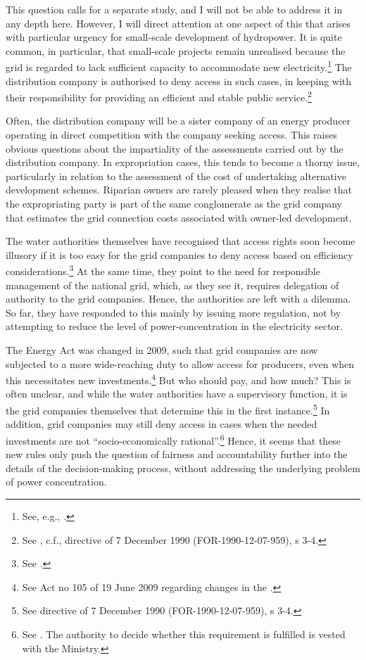This question calls for a separate study, and I will not be able to address it in any depth here. However, I will direct attention at one aspect of this that arises with particular urgency for small-scale development of hydropower. It is quite common, in particular, that small-scale projects remain unrealised because the grid is regarded to lack sufficient capacity to accommodate new electricity.\footnote{See, e.g., \cite[84,161-162]{nou129}.} The distribution company is authorised to deny access in such cases, in keeping with their responsibility for providing an efficient and stable public service.\footnote{See \cite[3-4]{ea90}, c.f., directive of 7 December 1990 (FOR-1990-12-07-959), s 3-4.}

Often, the distribution company will be a sister company of an energy producer operating in direct competition with the company seeking access. This raises obvious questions about the impartiality of the assessments carried out by the distribution company. In expropriation cases, this tends to become a thorny issue, particularly in relation to the assessment of the cost of undertaking alternative development schemes. Riparian owners are rarely pleased when they realise that the expropriating party is part of the same conglomerate as the grid company that estimates the grid connection costs associated with owner-led development.

The water authorities themselves have recognised that access rights soon become illusory if it is too easy for the grid companies to deny access based on efficiency considerations.\footnote{See \cite{otprp62}.} At the same time, they point to the need for responsible management of the national grid, which, as they see it, requires delegation of authority to the grid companies. Hence, the authorities are left with a dilemma. So far, they have responded to this mainly by issuing more regulation, not by attempting to reduce the level of power-concentration in the electricity sector.

The Energy Act was changed in 2009, such that grid companies are now subjected to a more wide-reaching duty to allow access for producers, even when this necessitates new investments.\footnote{See Act no 105 of 19 June 2009 regarding changes in the \cite{ea90}.} But who should pay, and how much? This is often unclear, and while the water authorities have a supervisory function, it is the grid companies themselves that determine this in the first instance.\footnote{See directive of 7 December 1990 (FOR-1990-12-07-959), s 3-4.} In addition, grid companies may still deny access in cases when the needed investments are not ``socio-economically rational''.\footnote{See \cite[3-4]{ea90}. The authority to decide whether this requirement is fulfilled is vested with the Ministry.} Hence, it seems that these new rules only push the question of fairness and accountability further into the details of the decision-making process, without addressing the underlying problem of power concentration. %

